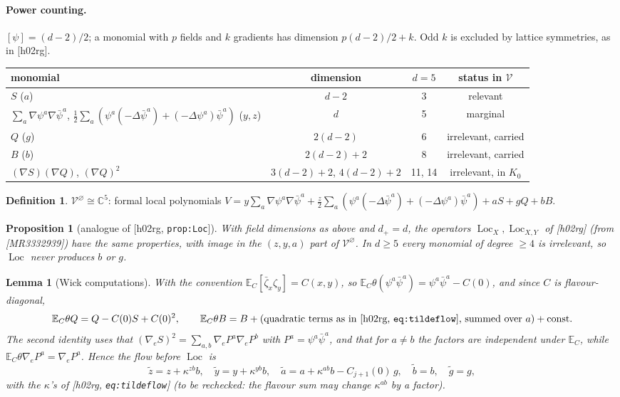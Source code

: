 \documentclass[11pt]{article}
\newtheorem{proposition}[theorem]{Proposition}
\newtheorem{lemma}[theorem]{Lemma}
\theoremstyle{remark}
\theoremstyle{definition}
\newtheorem{definition}[theorem]{Definition}
\newcommand{\E}{\mathbb{E}}
\newcommand{\C}{\mathbb{C}}
\newcommand{\Loc}{\operatorname{Loc}}
\newcommand{\cV}{\mathcal{V}}
\newcommand{\hr}[1]{\textup{[h02rg, \texttt{#1}]}}
\begin{document}
\paragraph{Power counting.} $[\psi]=(d-2)/2$; a monomial with $p$ fields and $k$ gradients has dimension $p(d-2)/2+k$.
Odd $k$ is excluded by lattice symmetries, as in [h02rg].

\begin{center}
\begin{tabular}{lccc}
monomial & dimension & $d=5$ & status in $\cV$\\\hline
$S$ ($a$) & $d-2$ & 3 & relevant\\
$\sum_a\nabla\psi^a\nabla\bar\psi^a$, $\frac12\sum_a(\psi^a(-\Delta\bar\psi^a)+(-\Delta\psi^a)\bar\psi^a)$ ($y,z$) & $d$ & 5 & marginal\\
$Q$ ($g$) & $2(d-2)$ & 6 & irrelevant, carried\\
$B$ ($b$) & $2(d-2)+2$ & 8 & irrelevant, carried\\
$(\nabla S)(\nabla Q)$, $(\nabla Q)^2$ & $3(d-2)+2$, $4(d-2)+2$ & 11, 14 & irrelevant, in $K_0$
\end{tabular}
\end{center}

\begin{definition}
$\cV^\varnothing\cong\C^5$: formal local polynomials
$V=y\sum_a\nabla\psi^a\nabla\bar\psi^a+\frac z2\sum_a(\psi^a(-\Delta\bar\psi^a)+(-\Delta\psi^a)\bar\psi^a)+aS+gQ+bB$.
\end{definition}

\begin{proposition}[analogue of \hr{prop:Loc}]
With field dimensions as above and $d_+=d$, the operators $\Loc_X,\Loc_{X,Y}$ of [h02rg] (from [MR3332939]) have the same properties,
with image in the $(z,y,a)$ part of $\cV^\varnothing$. In $d\ge5$ every monomial of degree $\ge4$ is irrelevant, so $\Loc$ never produces $b$ or $g$.
\end{proposition}

\begin{lemma}[Wick computations]\label{lem:wick}
With the convention $\E_C[\bar\zeta_x\zeta_y]=C(x,y)$, so $\E_C\theta(\psi^a\bar\psi^a)=\psi^a\bar\psi^a-C(0)$,
and since $C$ is flavour-diagonal,
\begin{equation}
  \E_C\theta Q=Q-C(0)S+C(0)^2,\qquad
  \E_C\theta B=B+\text{(quadratic terms as in \hr{eq:tildeflow}, summed over }a)+\text{const}.
\end{equation}
The second identity uses that $(\nabla_eS)^2=\sum_{a,b}\nabla_eP^a\nabla_eP^b$ with $P^a=\psi^a\bar\psi^a$, and that for $a\ne b$
the factors are independent under $\E_C$, while $\E_C\theta\nabla_eP^a=\nabla_eP^a$. Hence the flow before $\Loc$ is
\begin{equation}
  \tilde z=z+\kappa^{zb}b,\quad \tilde y=y+\kappa^{yb}b,\quad \tilde a=a+\kappa^{ab}b-C_{j+1}(0)\,g,\quad \tilde b=b,\quad \tilde g=g,
\end{equation}
with the $\kappa$'s of \hr{eq:tildeflow} (to be rechecked: the flavour sum may change $\kappa^{ab}$ by a factor).
\end{lemma}
\end{document}
